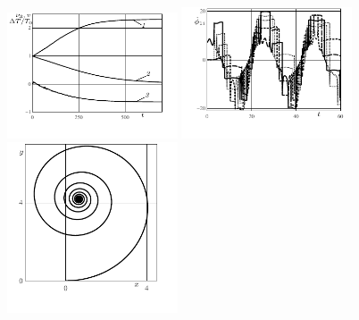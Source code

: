 \begin{figure}[H]
  \begin{center}
  \includegraphics[width=0.45\textwidth]{pic/figure7_1.pdf}
  \includegraphics[width=0.45\textwidth]{pic/figure7_2.pdf}
  \includegraphics[width=0.45\textwidth]{pic/figure7_3.pdf}
  \end{center}
  \caption{\ }
  \label{fig:wrench}
\end{figure}


%

%

%